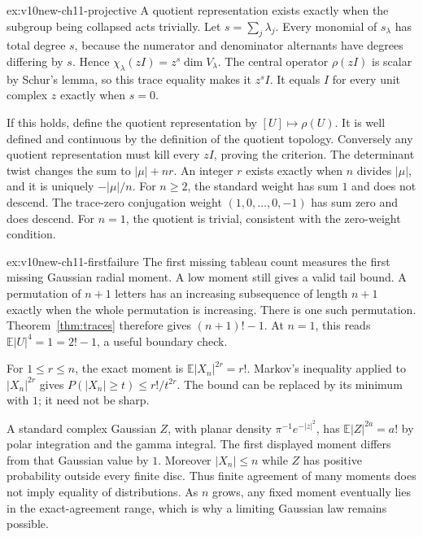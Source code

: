\begin{solution}{ex:v10new-ch11-projective}
\idea A quotient representation exists exactly when the subgroup being collapsed acts trivially.
\writeup Let $s=\sum_j\lambda_j$. Every monomial of $s_\lambda$ has total degree $s$, because the numerator and denominator alternants have degrees differing by $s$. Hence
$\chi_\lambda(zI)=z^s\dim V_\lambda$.
The central operator $\rho(zI)$ is scalar by Schur's lemma, so this trace equality makes it $z^s I$. It equals $I$ for every unit complex $z$ exactly when $s=0$.

If this holds, define the quotient representation by $[U]\mapsto\rho(U)$. It is well defined and continuous by the definition of the quotient topology. Conversely any quotient representation must kill every $zI$, proving the criterion. The determinant twist changes the sum to $|\mu|+nr$. An integer $r$ exists exactly when $n$ divides $|\mu|$, and it is uniquely $-|\mu|/n$. For $n\ge2$, the standard weight has sum $1$ and does not descend. The trace-zero conjugation weight $(1,0,\ldots,0,-1)$ has sum zero and does descend. For $n=1$, the quotient is trivial, consistent with the zero-weight condition.
\end{solution}

\begin{solution}{ex:v10new-ch11-firstfailure}
\idea The first missing tableau count measures the first missing Gaussian radial moment. A low moment still gives a valid tail bound.
\writeup A permutation of $n+1$ letters has an increasing subsequence of length $n+1$ exactly when the whole permutation is increasing. There is one such permutation. Theorem~\ref{thm:traces} therefore gives $(n+1)!-1$. At $n=1$, this reads $\mathbb E|U|^4=1=2!-1$, a useful boundary check.

For $1\le r\le n$, the exact moment is $\mathbb E|X_n|^{2r}=r!$. Markov's inequality applied to $|X_n|^{2r}$ gives $P(|X_n|\ge t)\le r!/t^{2r}$. The bound can be replaced by its minimum with $1$; it need not be sharp.

A standard complex Gaussian $Z$, with planar density $\pi^{-1}e^{-|z|^2}$, has $\mathbb E|Z|^{2a}=a!$ by polar integration and the gamma integral. The first displayed moment differs from that Gaussian value by $1$. Moreover $|X_n|\le n$ while $Z$ has positive probability outside every finite disc. Thus finite agreement of many moments does not imply equality of distributions. As $n$ grows, any fixed moment eventually lies in the exact-agreement range, which is why a limiting Gaussian law remains possible.
\end{solution}


